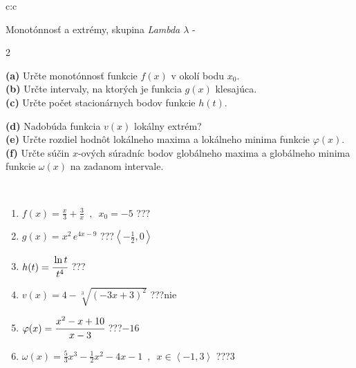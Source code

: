 \documentclass[10pt]{report}
\begin{document}
\newpage
\thispagestyle{empty}
\begin{tabular}{c:c}
\begin{minipage}[c][104.5mm][t]{0.5\linewidth}
\begin{center}
\vspace{7mm}
{\huge Monotónnosť a extrémy, skupina \textit{Lambda $\lambda$} -}\\[5mm]
\begin{minipage}{0.95\linewidth}
\begin{center}
{\small \begin{multicols}{2} \raggedright
\textbf{(a)} Určte monotónnosť funkcie \(f(x)\) v okolí bodu \(x_0\). \\[1mm]
\textbf{(b)} Určte intervaly, na ktorých je funkcia \(g(x)\) klesajúca. \\[1mm]
\textbf{(c)} Určte počet stacionárnych bodov funkcie \(h(t)\). \par \columnbreak
\textbf{(d)} Nadobúda funkcia \(v(x)\) lokálny extrém? \\[1mm]
\textbf{(e)} Určte rozdiel hodnôt lokálneho maxima a lokálneho minima funkcie \(\varphi(x)\). \\[1mm]
\textbf{(f)} Určte súčin \(x\)-ových súradníc bodov globálneho maxima a globálneho minima funkcie \(\omega(x)\) na zadanom intervale. \\[1mm]
\end{multicols}
}
\end{center}
\end{minipage}
\\[4mm]
\begin{minipage}{0.79\linewidth}
\begin{center}
\begin{varwidth}{\linewidth}
\begin{enumerate}
\normalsize
\item $f(x)=\frac{x}{3}+\frac{3}{x} \enspace , \enspace x_0=-5$\quad \dotfill\; ???\;\dotfill \quad {}
\item $g(x)=x^2\, e^{4x-9}$\quad \dotfill\; ???\;\dotfill \quad $\left\langle-\frac{1}{2} , 0\right\rangle$
\item $h(t)=\cfrac{\ln t}{t^4}$\quad \dotfill\; ???\;\dotfill {}
\item $v(x)=4-\sqrt[3]{(-3x+3)^2}$\quad \dotfill\; ???\;\dotfill \quad $\text{nie}$
\item $\varphi(x)=\cfrac{x^2-x+10}{x-3}$\quad \dotfill\; ???\;\dotfill \quad $-16$
\item $\omega(x)=\frac{5}{3}x^3-\frac{1}{2}x^2-4x-1 \enspace , \enspace x\in\left\langle-1 , 3\right\rangle$\quad \dotfill\; ???\;\dotfill \quad $3$

\end{enumerate}
\end{varwidth}
\end{center}
\end{minipage}
\end{center}
\end{minipage}
\end{tabular}
\end{document}
